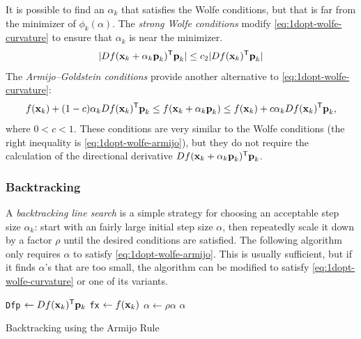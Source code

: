 It is possible to find an $\alpha_k$ that satisfies the Wolfe conditions, but that is far from the minimizer of $\phi_k(\alpha)$.
The \emph{strong Wolfe conditions} modify \eqref{eq:1dopt-wolfe-curvature} to ensure that $\alpha_k$ is near the minimizer.
\[
| Df(\textbf{x}_k + \alpha_k \textbf{p}_k)^{\mathsf T} \textbf{p}_k| \leq c_2| Df(\textbf{x}_k)^{\mathsf T} \textbf{p}_k|
\]
The \emph{Armijo--Goldstein conditions} provide another alternative to \eqref{eq:1dopt-wolfe-curvature}:
\[
f(\textbf{x}_k) + (1 - c)\alpha_k Df(\textbf{x}_k)^{\mathsf T} \textbf{p}_k \leq f(\textbf{x}_k + \alpha_k\textbf{p}_k) \leq f(\textbf{x}_k) + c\alpha_k Df(\textbf{x}_k)^{\mathsf T}\textbf{p}_k,
\]
where $0 < c < 1$.
These conditions are very similar to the Wolfe conditions (the right inequality is \eqref{eq:1dopt-wolfe-armijo}), but they do not require the calculation of the directional derivative $ Df(\textbf{x}_k + \alpha_k \textbf{p}_k)^{\mathsf T}\textbf{p}_k$.

\subsubsection*{Backtracking}

A \emph{backtracking line search} is a simple strategy for choosing an acceptable step size $\alpha_k$: start with an fairly large initial step size $\alpha$, then repeatedly scale it down by a factor $\rho$ until the desired conditions are satisfied.
The following algorithm only requires $\alpha$ to satisfy \eqref{eq:1dopt-wolfe-armijo}.
This is usually sufficient, but if it finds $\alpha$'s that are too small, the algorithm can be modified to satisfy \eqref{eq:1dopt-wolfe-curvature} or one of its variants.

\begin{algorithm}[H]
\begin{algorithmic}[1]
    \State \texttt{Dfp} $\gets Df(\mathbf{x}_k)^{\mathsf T}\mathbf{p}_k$
    \State \texttt{fx} $\gets f(\mathbf{x}_k)$
        \State $\alpha \gets \rho\alpha$
    \EndWhile
    \Return $\alpha$
\EndProcedure
\end{algorithmic}
\caption{Backtracking using the Armijo Rule}
\label{Alg:opt1d-backtracking}
\end{algorithm}

